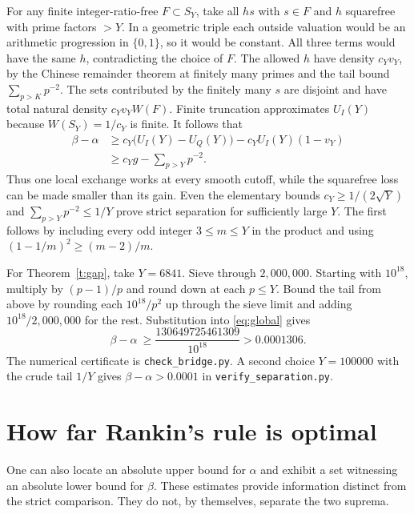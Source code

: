 \documentclass[11pt]{article}
\begin{document}
For any finite integer-ratio-free $F\subset S_Y$, take all $hs$ with $s\in F$ and $h$ squarefree with prime factors $>Y$. In a geometric triple each outside valuation would be an arithmetic progression in $\{0,1\}$, so it would be constant. All three terms would have the same $h$, contradicting the choice of $F$. The allowed $h$ have density $c_Yv_Y$, by the Chinese remainder theorem at finitely many primes and the tail bound $\sum_{p>K}p^{-2}$. The sets contributed by the finitely many $s$ are disjoint and have total natural density $c_Yv_Y W(F)$. Finite truncation approximates $U_I(Y)$ because $W(S_Y)=1/c_Y$ is finite. It follows that
\begin{align}
 \beta-\alpha
 &\ge c_Y\big(U_I(Y)-U_Q(Y)\big)-c_Y U_I(Y)(1-v_Y)\nonumber\\
 &\ge c_Yg-\sum_{p>Y}p^{-2}.\label{eq:global}
\end{align}
Thus one local exchange works at every smooth cutoff, while the squarefree loss can be made smaller than its gain. Even the elementary bounds $c_Y\ge1/(2\sqrt Y)$ and $\sum_{p>Y}p^{-2}\le1/Y$ prove strict separation for sufficiently large $Y$. The first follows by including every odd integer $3\le m\le Y$ in the product and using $(1-1/m)^2\ge(m-2)/m$.

For Theorem~\ref{t:gap}, take $Y=6841$. Sieve through $2{,}000{,}000$. Starting with $10^{18}$, multiply by $(p-1)/p$ and round down at each $p\le Y$. Bound the tail from above by rounding each $10^{18}/p^2$ up through the sieve limit and adding $10^{18}/2,000,000$ for the rest. Substitution into \eqref{eq:global} gives
\[
   \beta-\alpha\ \ge\frac{130649725461309}{10^{18}}>0.0001306 .
\]
The numerical certificate is \texttt{check\_bridge.py}. A second choice $Y=100000$ with the crude tail $1/Y$ gives $\beta-\alpha>0.0001$ in \texttt{verify\_separation.py}.
\section{How far Rankin's rule is optimal}
One can also locate an absolute upper bound for $\alpha$ and exhibit a set witnessing an absolute lower bound for $\beta$. These estimates provide information distinct from the strict comparison. They do not, by themselves, separate the two suprema.
\end{document}

